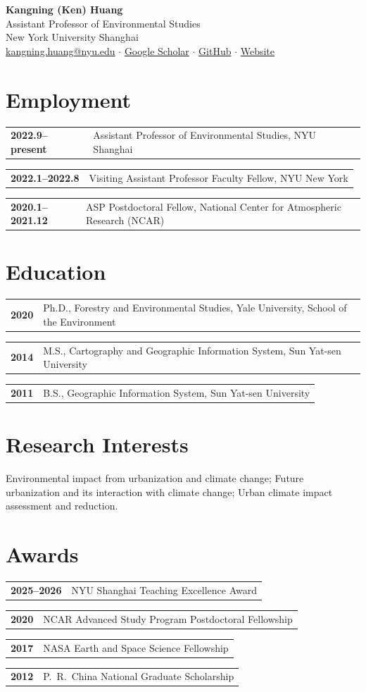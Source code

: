 \documentclass[11pt,letterpaper]{article}
\makeatletter
\newcommand{\cventry}[2]{%
  \noindent\begin{tabularx}{\textwidth}{@{}l X@{}}
    \textbf{#1} & #2
  \end{tabularx}\vspace{2pt}%
}
\makeatother
\begin{document}
\begin{center}
  {\LARGE\bfseries Kangning (Ken) Huang}\\[6pt]
  {\normalsize Assistant Professor of Environmental Studies}\\[2pt]
  {\normalsize New York University Shanghai}\\[6pt]
  {\small
    \href{mailto:kangning.huang@nyu.edu}{kangning.huang@nyu.edu}
    \enspace$\cdot$\enspace
    \href{https://scholar.google.com/citations?user=s_domssAAAAJ}{Google Scholar}
    \enspace$\cdot$\enspace
    \href{https://github.com/kangning-huang}{GitHub}
    \enspace$\cdot$\enspace
    \href{https://kangning-huang.com/}{Website}
  }
\end{center}

\vspace{-4pt}

\section{Employment}
\cventry{2022.9--present}{Assistant Professor of Environmental Studies, NYU Shanghai}
\cventry{2022.1--2022.8}{Visiting Assistant Professor Faculty Fellow, NYU New York}
\cventry{2020.1--2021.12}{ASP Postdoctoral Fellow, National Center for Atmospheric Research (NCAR)}

\section{Education}
\cventry{2020}{Ph.D., Forestry and Environmental Studies, Yale University, School of the Environment}
\cventry{2014}{M.S., Cartography and Geographic Information System, Sun Yat-sen University}
\cventry{2011}{B.S., Geographic Information System, Sun Yat-sen University}

\section{Research Interests}
Environmental impact from urbanization and climate change; Future urbanization and its interaction with climate change; Urban climate impact assessment and reduction.

\section{Awards}
\cventry{2025--2026}{NYU Shanghai Teaching Excellence Award}
\cventry{2020}{NCAR Advanced Study Program Postdoctoral Fellowship}
\cventry{2017}{NASA Earth and Space Science Fellowship}
\cventry{2012}{P.~R.\ China National Graduate Scholarship}
\end{document}
